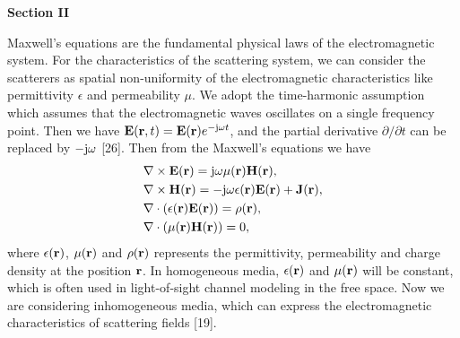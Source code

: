 \documentclass[a4paper,12pt]{article}
\begin{document}
\begin{framed}
	{\bf Section II}

	\setcounter{equation}{0}

    \quad Maxwell's equations are the fundamental physical laws of the electromagnetic system. For the characteristics of the scattering system, we can consider the scatterers as spatial non-uniformity of the electromagnetic characteristics like permittivity $\epsilon$ and permeability $\mu$. {\color{red}We adopt the time-harmonic assumption which assumes that the electromagnetic waves oscillates on a single frequency point. Then we have ${\bf E}({\bf r},t) = {\bf E}({\bf r})e^{-{\rm j}\omega t}$, and the partial derivative $\partial/\partial t$ can be replaced by $-{\rm j}\omega$ [26].
Then from the Maxwell's equations we have}
\begin{subequations}
	\begin{align} 
		&\nabla \times {\bf E}({\bf r}) = {\rm j}\omega \mu({\bf r}) {\bf H}({\bf r}), \label{maxwell_1}\\
		& \nabla \times {\bf H}({\bf r}) = -{\rm j}\omega \epsilon({\bf r}) {\bf E}({\bf r})+{\bf J}({\bf r}),  \label{maxwell_2}\\
		& \nabla \cdot  (\epsilon({\bf r}) {\bf E}({\bf r})) = \rho({\bf r}),\\
		& \nabla \cdot (\mu({\bf r}) {\bf H}({\bf r})) = 0,
	\end{align}
\end{subequations}
where $\epsilon({\bf r})$, ${\mu}({\bf r})$ and $\rho({\bf r})$ represents the permittivity, permeability and charge density at the position ${\bf r}$. In homogeneous media, $\epsilon({\bf r})$ and ${\mu}({\bf r})$ will be constant, which is often used in light-of-sight channel modeling in the free space. Now we are considering inhomogeneous media, which can express the electromagnetic characteristics of scattering fields [19]. 


\end{framed}
\end{document}
